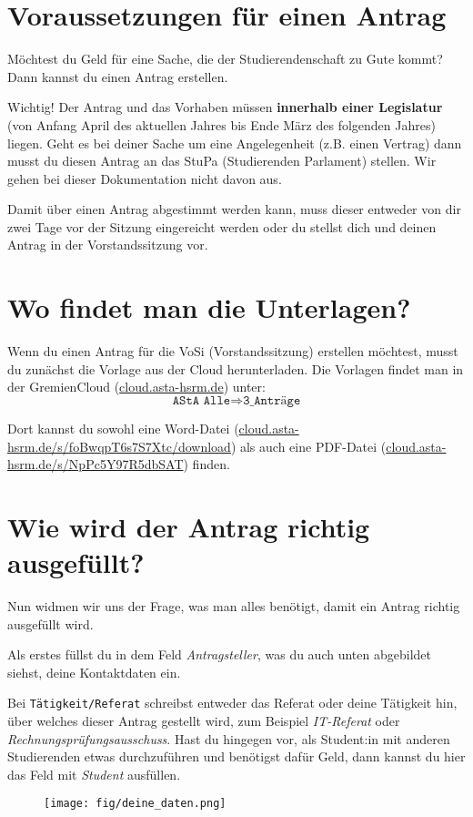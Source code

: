 
\section{Voraussetzungen für einen Antrag}
Möchtest du Geld für eine Sache, die der Studierendenschaft zu Gute kommt? Dann kannst du einen Antrag erstellen.

Wichtig! Der Antrag und das Vorhaben müssen \textbf{innerhalb einer Legislatur} (von Anfang April des aktuellen Jahres bis Ende März des folgenden Jahres) liegen.
Geht es bei deiner Sache um eine Angelegenheit (z.B. einen Vertrag) dann musst du diesen Antrag an das StuPa (Studierenden Parlament) stellen.  Wir gehen bei dieser Dokumentation nicht davon aus.

Damit über einen Antrag abgestimmt werden kann, muss dieser entweder von dir zwei Tage vor der Sitzung eingereicht werden oder du stellst dich und deinen Antrag in der Vorstandssitzung vor.



\section{Wo findet man die Unterlagen?}
Wenn du einen Antrag für die VoSi (Vorstandssitzung) erstellen möchtest, musst du zunächst die Vorlage aus der Cloud herunterladen. 
Die Vorlagen findet man in der GremienCloud (\href{https://cloud.asta-hsrm.de}{cloud.asta-hsrm.de}) unter:
\[\texttt{AStA Alle}\Rightarrow \texttt{3\_Anträge}\]

Dort kannst du sowohl eine Word-Datei (\href{https://cloud.asta-hsrm.de/s/foBwqpT6s7S7Xtc/download}{cloud.asta-hsrm.de/s/foBwqpT6s7S7Xtc/download}) 
als auch eine PDF-Datei (\href{https://cloud.asta-hsrm.de/s/NpPc5Y97R5dbSAT}{cloud.asta-hsrm.de/s/NpPc5Y97R5dbSAT}) finden. 

\section{Wie wird der Antrag richtig ausgefüllt?}
Nun widmen wir uns der Frage, was man alles benötigt, damit ein Antrag richtig ausgefüllt wird.

Als erstes füllst du in dem Feld \textit{Antragsteller}, was du auch unten abgebildet siehst, deine Kontaktdaten ein. 

Bei \texttt{Tätigkeit/Referat} schreibst entweder das Referat oder deine Tätigkeit hin, über welches dieser Antrag gestellt wird, zum Beispiel \textit{IT-Referat} oder \textit{Rechnungsprüfungsausschuss}.
Hast du hingegen vor, als Student:in mit anderen Studierenden etwas durchzuführen und benötigst dafür Geld, dann kannst du hier das Feld mit \textit{Student} ausfüllen.
\begin{figure}[ht!]
  \centering
  \texttt{[image: fig/deine\_daten.png]}
\end{figure}

